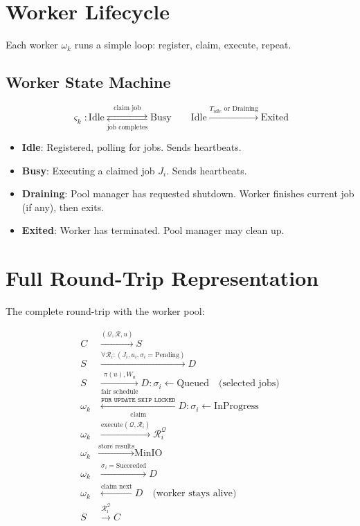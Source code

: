 \documentclass[11pt]{article}
\begin{document}
\section{Worker Lifecycle}
\label{sec:worker-lifecycle}

Each worker $\omega_k$ runs a simple loop: register, claim, execute, repeat.

\subsection{Worker State Machine}

\begin{equation}
\varsigma_k: \text{Idle}
  \underset{\text{job completes}}{\overset{\text{claim job}}{\rightleftarrows}}
  \text{Busy}
  \qquad
  \text{Idle} \xrightarrow{T_{idle}\text{ or Draining}} \text{Exited}
\end{equation}

\begin{itemize}
\item \textbf{Idle}: Registered, polling for jobs. Sends heartbeats.
\item \textbf{Busy}: Executing a claimed job $J_i$. Sends heartbeats.
\item \textbf{Draining}: Pool manager has requested shutdown. Worker finishes current
  job (if any), then exits.
\item \textbf{Exited}: Worker has terminated. Pool manager may clean up.
\end{itemize}


\section{Full Round-Trip Representation}
\label{sec:full-round-trip}

The complete round-trip with the worker pool:

\begin{equation}
\begin{split}
C &\xrightarrow{(\mathcal{Q}, \mathcal{R}, u)} S \\
S &\xrightarrow{\forall \mathcal{R}_i: (J_i, u_i, \sigma_i=\text{Pending})} D \\
S &\xrightarrow[\text{fair schedule}]{\pi(u), W_a} D: \sigma_i \gets \text{Queued}
  \quad \text{(selected jobs)} \\
\omega_k &\xleftarrow[\text{claim}]{\texttt{FOR UPDATE SKIP LOCKED}} D:
  \sigma_i \gets \text{InProgress} \\
\omega_k &\xrightarrow{\text{execute}(\mathcal{Q}, \mathcal{R}_i)}
  \mathcal{R}_i^{\mathcal{Q}} \\
\omega_k &\xrightarrow{\text{store results}} \text{MinIO} \\
\omega_k &\xrightarrow{\sigma_i = \text{Succeeded}} D \\
\omega_k &\xleftarrow{\text{claim next}} D
  \quad \text{(worker stays alive)} \\
S &\xrightarrow{\mathcal{R}_i^{\mathcal{Q}}} C
\end{split}
\end{equation}
\end{document}
